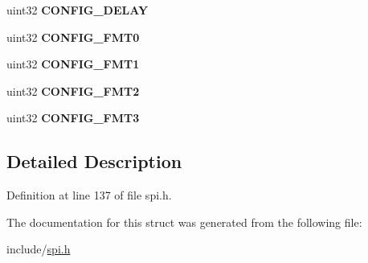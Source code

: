 \begin{DoxyCompactItemize}
uint32 {\bfseries C\+O\+N\+F\+I\+G\+\_\+\+D\+E\+L\+AY}
\item 
\mbox{\label{structspi__config__reg_a1cd53c8f775c6cff866a39f6df239c06}} 
uint32 {\bfseries C\+O\+N\+F\+I\+G\+\_\+\+F\+M\+T0}
\item 
\mbox{\label{structspi__config__reg_aeefbcb1b7d59b20c0888fb1a93c080a1}} 
uint32 {\bfseries C\+O\+N\+F\+I\+G\+\_\+\+F\+M\+T1}
\item 
\mbox{\label{structspi__config__reg_a551af4494efdc587b352efe46439bf56}} 
uint32 {\bfseries C\+O\+N\+F\+I\+G\+\_\+\+F\+M\+T2}
\item 
\mbox{\label{structspi__config__reg_ab853765e9fc9689edac33e8a73ae8b1d}} 
uint32 {\bfseries C\+O\+N\+F\+I\+G\+\_\+\+F\+M\+T3}
\end{DoxyCompactItemize}


\subsection{Detailed Description}


Definition at line 137 of file spi.\+h.



The documentation for this struct was generated from the following file\+:\begin{DoxyCompactItemize}
\item 
include/\mbox{\hyperlink{spi_8h}{spi.\+h}}\end{DoxyCompactItemize}
